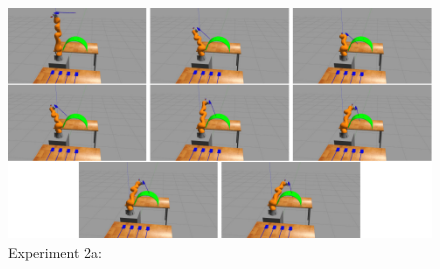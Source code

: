 \begin{center}
\begin{figure}[!htb]
\centering
\includegraphics[width=\textwidth]{images/robot_planner2a}
\caption{Experiment 2a:}
\label{experiment-robot-planner2a}
\end{figure}
\end{center}

